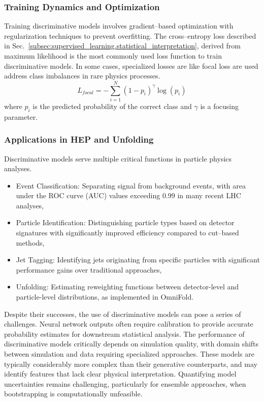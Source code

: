     \subsubsection{Training Dynamics and Optimization}
        Training discriminative models involves gradient--based optimization with regularization techniques to prevent overfitting.
        The cross--entropy loss described in Sec.~\ref{subsec:supervised_learning.statistical_interpretation}, derived from maximum likelihood is the most commonly used loss function to train discriminative models.
        In some cases, specialized losses are like focal loss are used address class imbalances in rare physics processes.
        \begin{equation}
            L_{focal} = -\sum_{i=1}^N (1-p_i)^\gamma \log(p_i)
        \end{equation}
        where \(p_i\) is the predicted probability of the correct class and \(\gamma\) is a focusing parameter.

    \subsubsection{Applications in HEP and Unfolding}
        Discriminative models serve multiple critical functions in particle physics analyses.
        \begin{itemize}
            \item Event Classification: Separating signal from background events, with area under the ROC curve (AUC) values exceeding 0.99 in many recent LHC analyses,
            \item Particle Identification: Distinguishing particle types based on detector signatures with significantly improved efficiency compared to cut--based methods,
            \item Jet Tagging: Identifying jets originating from specific particles with significant performance gains over traditional approaches,
            \item Unfolding: Estimating reweighting functions between detector-level and particle-level distributions, as implemented in OmniFold.
        \end{itemize}
        Despite their successes, the use of discriminative models can pose a series of challenges.
        Neural network outputs often require calibration to provide accurate probability estimates for downstream statistical analysis.
        The performance of discriminative models critically depends on simulation quality, with domain shifts between simulation and data requiring specialized approaches.
        These models are typically considerably more complex than their generative counterparts, and may identify features that lack clear physical interpretation.
        Quantifying model uncertainties remains challenging, particularly for ensemble approaches, when bootstrapping is computationally unfeasible.

